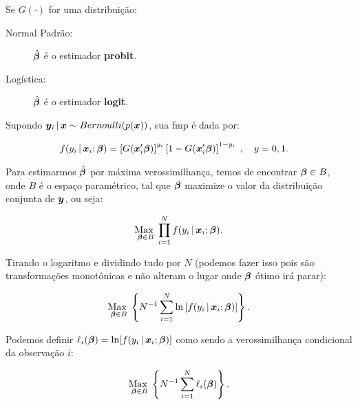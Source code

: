 \documentclass[11pt,oneside,a4paper]{article}
\numberwithin{equation}{section}
\begin{document}
\begin{description}
\begin{description}
Se $G(\cdot)$ for uma distribuição:

\begin{description}
	\item [Normal Padrão:] $\hat{\boldsymbol{\beta}}$ é o estimador \textbf{probit}.
	\item [Logística:] $\hat{\boldsymbol{\beta}}$ é o estimador \textbf{logit}.
\end{description}

Supondo $\boldsymbol{y}_{i} \, | \, \boldsymbol{x} \sim Bernoulli(p(\boldsymbol{x}))$, sua fmp é dada por:

\vspace{-1 em}
\begin{align*}
f( y_{i} \, | \, \boldsymbol{x}_{i} ; \boldsymbol{\beta} ) 
&= 
\left[ G(\boldsymbol{x}_{i}' \boldsymbol{\beta} )  \right]^{y_{i}}
\left[ 1 - G(\boldsymbol{x}_{i}' \boldsymbol{\beta} )  \right]^{1 - y_{i}}
\; , \quad y=0,1.
\end{align*}

Para estimarmos $\hat{\boldsymbol{\beta}}$ por máxima verossimilhança, temos de encontrar $\boldsymbol{\beta} \in B$, onde $B$ é o espaço paramétrico, tal que $\boldsymbol{\beta}$ maximize o valor da distribuição conjunta de $\boldsymbol{y}$, ou seja:

\vspace{-1 em}
\begin{align*}
	\underset{\boldsymbol{\beta} \in B}{\text{Max }} 
	\prod_{i=1}^{N}
	f( y_{i} \, | \, \boldsymbol{x}_{i} ; \boldsymbol{\beta} ).
\end{align*}

\noindent

Tirando o logaritmo e dividindo tudo por $N$ (podemos fazer isso pois são transformações monotônicas e não alteram o lugar onde $\boldsymbol{\beta}$ ótimo irá parar):

\vspace{-1 em}
\begin{align*}
\underset{\boldsymbol{\beta} \in B}{\text{Max }} 
\left\{ 
N^{-1} \sum_{i=1}^{N}
\ln \left[ f( y_{i} \, | \, \boldsymbol{x}_{i} ; \boldsymbol{\beta} ) \right]
\right\}.
\end{align*}

\noindent
Podemos definir
$\ell_{i}( \boldsymbol{\beta} ) = \ln[ f( y_{i} \, | \, \boldsymbol{x}_{i} ; \boldsymbol{\beta} ) ]$
como sendo a verossimilhança condicional da observação $i$:

\vspace{-1 em}
\begin{align*}
\underset{\boldsymbol{\beta} \in B}{\text{Max }} 
\left\{ 
N^{-1} \sum_{i=1}^{N} \ell_{i} (\boldsymbol{\beta})
\right\}.
\end{align*}


\end{description}
\end{description}
\end{document}
